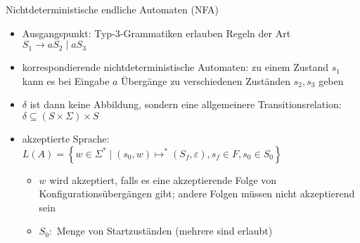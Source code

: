 \begin{frame}{Nichtdeterministische endliche Automaten (NFA)}
	\begin{itemize}
		\item Ausgangspunkt: Typ-3-Grammatiken erlauben Regeln der Art\\
		\quad $S_1 \rightarrow aS_2 \mid aS_3$
		\item korrespondierende nichtdeterministische Automaten: zu
		einem Zustand $s_1$ kann es bei Eingabe $a$ Übergänge zu
		verschiedenen Zuständen $s_2, s_3$ geben
		\item $\delta$ ist dann keine Abbildung, sondern eine allgemeinere Transitionsrelation:\\
		\quad $\delta \subseteq (S \times \Sigma) \times S$
		\item akzeptierte Sprache:\\
		\quad $L(A)=\left\{w \in \Sigma^* \mid (s_0,w) \mapsto^* (S_f, \varepsilon), s_f \in F, s_0 \in S_0 \right\}$
		\begin{itemize}
			\item $w$ wird akzeptiert, falls es eine akzeptierende Folge von Konfigurationsübergängen gibt; andere Folgen müssen nicht akzeptierend sein
			\item $S_0:$ Menge von Startzuständen (mehrere sind erlaubt)
		\end{itemize}
	\end{itemize}
\end{frame}

